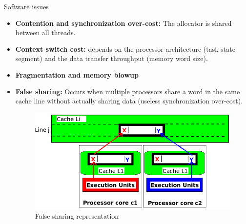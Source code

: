 \documentclass[final]{beamer}
\newlength{\onecolwid}
\newlength{\twocolwid}
\begin{document}
\begin{frame}[t]
\begin{columns}[t]
\begin{column}{\twocolwid}
\begin{columns}[t,totalwidth=\twocolwid]
\begin{column}{\onecolwid} %


\begin{block}{Software issues}

\begin{itemize}
\item \textbf{Contention and synchronization over-cost:} The allocator is shared between all threads.
\item \textbf{Context switch cost:} depends on the processor architecture (task state segment) and the data transfer throughput (memory word size).
\item \textbf{Fragmentation and memory blowup}
\item \textbf{False sharing:} Occurs when multiple processors share a word in the same cache line without actually sharing data (useless synchronization over-cost).
\begin{figure}
\includegraphics[width=1.0\linewidth]{charts/falseSharing.png}
\caption{False sharing representation}
\end{figure}

\end{itemize}


\end{block}


\end{column} %


\end{columns}
\end{column}
\end{columns}
\end{frame}
\end{document}
